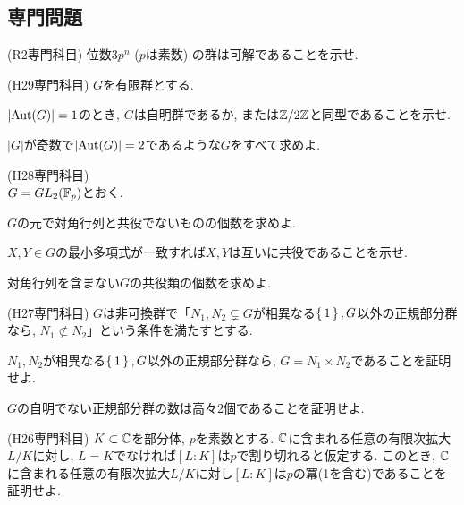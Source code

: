 \subsection{専門問題}
\begin{prob} \checkbox (R2専門科目)
位数$3p^n$ ($p$は素数) の群は可解であることを示せ.
\end{prob}
\begin{hint}
\end{hint}

\begin{prob} \checkbox (H29専門科目)
$G$を有限群とする.
\ben
\item $|\mathrm{Aut}(G)| = 1$のとき, $G$は自明群であるか, または$\mathbb{Z}/2\mathbb{Z}$と同型であることを示せ.
\item $|G|$が奇数で$|\mathrm{Aut}(G)| = 2$であるような$G$をすべて求めよ.
\een
\end{prob}
\begin{hint}
\end{hint}

\begin{prob} \checkbox (H28専門科目)\\
$G = GL_2(\mathbb{F}_{p})$とおく.
\ben
\item $G$の元で対角行列と共役でないものの個数を求めよ.
\item $X,Y\in G$の最小多項式が一致すれば$X,Y$は互いに共役であることを示せ.
\item 対角行列を含まない$G$の共役類の個数を求めよ.
\een
\end{prob}
\begin{hint}
\end{hint}

\begin{prob} \checkbox (H27専門科目)
$G$は非可換群で「$N_1,N_2\subsetneq G$が相異なる$\set{1},G$以外の正規部分群なら, $N_1\not\subset N_2$」という条件を満たすとする.
\ben
\item$N_1,N_2$が相異なる$\set{1},G$以外の正規部分群なら, $G=N_1\times N_2$であることを証明せよ.
\item $G$の自明でない正規部分群の数は高々2個であることを証明せよ.
\een
\end{prob}
\begin{hint}
\end{hint}

\begin{prob} (H26専門科目)
$K\subset \mathbb{C}$を部分体, $p$を素数とする. $\mathbb{C}$に含まれる任意の有限次拡大$L/K$に対し, $L=K$でなければ$[L:K]$は$p$で割り切れると仮定する. このとき, $\mathbb{C}$に含まれる任意の有限次拡大$L/K$に対し$[L:K]$は$p$の冪(1を含む)であることを証明せよ.
\end{prob}
\begin{hint}
\end{hint}
